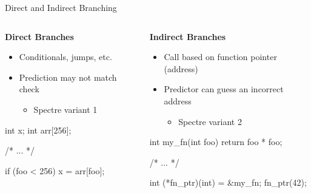 \documentclass[10pt, dvipsnames, aspectratio=169]{beamer}
\begin{document}
\begin{frame}[c,fragile]{Direct and Indirect Branching}
  \begin{columns}
    \begin{column}[t]{0.5\textwidth}
      {\bf\color{blue}\Large Direct Branches}
      \begin{itemize}
        \item Conditionals, jumps, etc.
        \item Prediction may not match check
        \begin{itemize}
          \item Spectre variant 1
        \end{itemize}
      \end{itemize}

      \vspace{1em}
      \begin{listing}[language=c,gobble=8,xleftmargin=5em]
        int x;
        int arr[256];

        /* ... */

        if (foo < 256) {
            x = arr[foo];
        }
      \end{listing}
    \end{column}

    \begin{column}[t]{0.5\textwidth}
      {\bf\color{orange}\Large Indirect Branches}
      \begin{itemize}
        \item Call based on function pointer (address)
        \item Predictor can guess an incorrect address
        \begin{itemize}
          \item Spectre variant 2
        \end{itemize}
      \end{itemize}

      \vspace{1em}
      \begin{listing}[language=c,gobble=8,xleftmargin=5em]
        int my_fn(int foo) {
            return foo * foo;
        }

        /* ... */

        int (*fn_ptr)(int) = &my_fn;
        fn_ptr(42);
      \end{listing}
    \end{column}
  \end{columns}
\end{frame}
\end{document}
